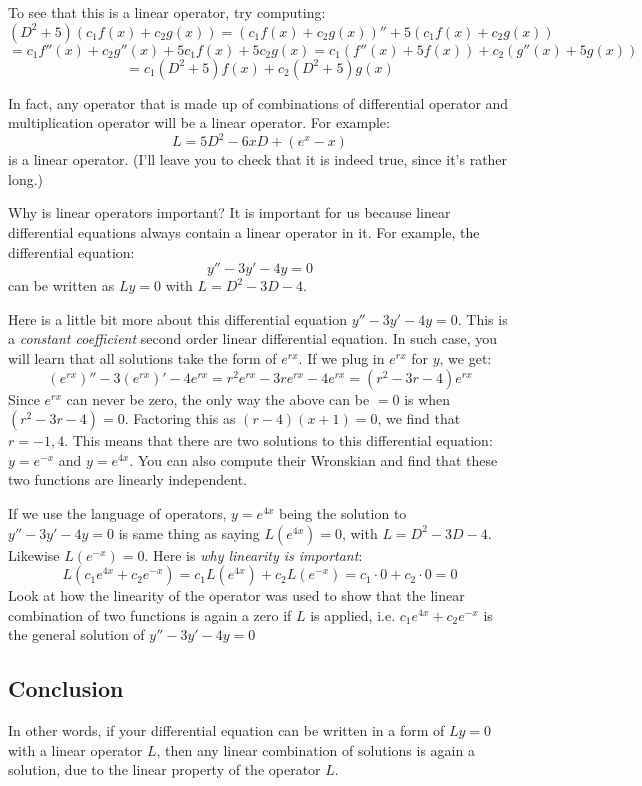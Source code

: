 \documentclass[12pt]{report}
\begin{document}
To see that this is a linear operator, try computing:
$$(D^2+5)(c_1 f(x) + c_2 g(x)) = (c_1 f(x) + c_2 g(x))''+5(c_1 f(x) + c_2 g(x)) $$
$$= c_1 f''(x) + c_2 g''(x) + 5c_1 f(x) + 5c_2 g(x) = c_1(f''(x) + 5f(x)) + c_2(g''(x) + 5g(x))$$
$$= c_1 (D^2+5) f(x) + c_2 (D^2+5) g(x)$$

In fact, any operator that is made up of combinations of differential operator and multiplication operator will be a linear operator. For example:
$$L = 5D^2 - 6x D + (e^x -x)$$
is a linear operator. (I'll leave you to check that it is indeed true, since it's rather long.)

Why is linear operators important? It is important for us because linear differential equations always contain a linear operator in it. For example, the differential equation:
$$y'' -3y' -4y =0$$
can be written as $L y=0$ with $L=D^2 -3D -4$.

Here is a little bit more about this differential equation $y'' -3y' -4y =0$. This is a \textit{constant coefficient} second order linear differential equation. In such case, you will learn that all solutions take the form of $e^{rx}$. If we plug in $e^{rx}$ for $y$, we get:
$$\left( e^{rx} \right)'' - 3 \left(e^{rx}\right)' - 4 e^{rx} = r^2 e^{rx} -3 re^{rx}- 4e^{rx}=(r^2-3r-4)e^{rx}$$
Since $e^{rx}$ can never be zero, the only way the above can be $=0$ is when $(r^2-3r-4)=0$. Factoring this as $(r-4)(x+1)=0$, we find that $r= -1, 4$. This means that there are two solutions to this differential equation: $y=e^{-x}$ and $y=e^{4x}$. You can also compute their Wronskian and find that these two functions are linearly independent.

If we use the language of operators, $y=e^{4x}$ being the solution to $y'' -3y' -4y =0$ is same thing as saying $L\left(e^{4x}\right)=0$, with $L=D^2 -3D -4$. Likewise $L\left(e^{-x}\right)=0$. Here is \textit{why linearity is important}:
$$L\left(c_1 e^{4x} + c_2 e^{-x} \right)=c_1 L\left(e^{4x}\right)+c_2 L\left(e^{-x}\right) = c_1\cdot 0+c_2\cdot0=0 $$
Look at how the linearity of the operator was used to show that the linear combination of two functions is again a zero if $L$ is applied, i.e. $c_1 e^{4x} + c_2 e^{-x}$ is the general solution of $y'' -3y' -4y =0$

\subsection*{Conclusion}
In other words, if your differential equation can be written in a form of $L y =0$ with a linear operator $L$, then any linear combination of solutions is again a solution, due to the linear property of the operator $L$.
\end{document}
